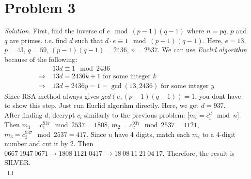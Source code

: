 \section*{Problem 3}
	\begin{proof} [Solution]
		First, find the inverse of $e \mod(p - 1)(q - 1)$ where $n = pq$, $p$ and $q$ are primes. i.e. find $d$ such that $d\cdot e \equiv 1 \mod(p - 1)(q - 1)$. Here, $e = 13$, $p = 43$, $q = 59$, $(p - 1)(q - 1) = 2436$, $n = 2537$. We can use \textit{Euclid algorithm} because of the following:
		\begin{align*}
			&13d \equiv 1 \mod 2436\\
			\Rightarrow\ & 13d = 2436k + 1 \mbox{ for some integer }k\\
			\Rightarrow\ & 13d + 2436y = 1 = \gcd(13, 2436) \mbox{ for some integer }y
		\end{align*}
		Since RSA method always gives $gcd(e, (p - 1)(q - 1)) = 1$, you don\textquotesingle t have to show this step. Just run Euclid algorihm directly. Here, we get $d = 937$.\\
		After finding $d$, decrypt $c_i$ similarly to the previous problem: [$m_i = c_i^d \mod n$]. Then $m_1 = c_1^{937} \mod 2537 = 1808$, $m_2 = c_2^{937} \mod 2537 = 1121$, $m_3 = c_3^{937} \mod 2537 = 417$. Since $n$ have 4 digits, match each $m_i$ to a 4-digit number and cut it by 2. Then $0667\ 1947\ 0671 \rightarrow 1808\ 1121\ 0417\ \rightarrow 18\ 08\ 11\ 21\ 04\ 17$. Therefore, the result is SILVER.\\
	\end{proof}